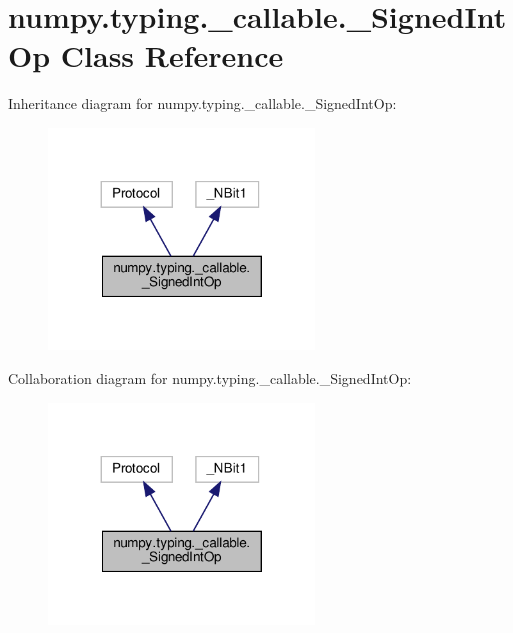\hypertarget{classnumpy_1_1typing_1_1__callable_1_1__SignedIntOp}{}\section{numpy.\+typing.\+\_\+callable.\+\_\+\+Signed\+Int\+Op Class Reference}
\label{classnumpy_1_1typing_1_1__callable_1_1__SignedIntOp}


Inheritance diagram for numpy.\+typing.\+\_\+callable.\+\_\+\+Signed\+Int\+Op\+:
\nopagebreak
\begin{figure}[H]
\begin{center}
\leavevmode
\includegraphics[width=200pt]{classnumpy_1_1typing_1_1__callable_1_1__SignedIntOp__inherit__graph}
\end{center}
\end{figure}


Collaboration diagram for numpy.\+typing.\+\_\+callable.\+\_\+\+Signed\+Int\+Op\+:
\nopagebreak
\begin{figure}[H]
\begin{center}
\leavevmode
\includegraphics[width=200pt]{classnumpy_1_1typing_1_1__callable_1_1__SignedIntOp__coll__graph}
\end{center}
\end{figure}
